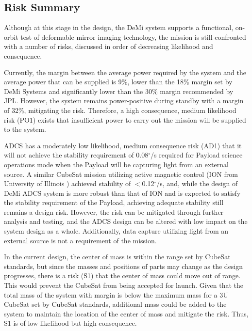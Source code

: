 \documentclass[12pt]{article}
\begin{document}
		\subsection{Risk Summary}

Although at this stage in the design, the DeMi system supports a functional, on-orbit test of deformable mirror imaging technology, the mission is still confronted with a number of risks, discussed in order of decreasing likelihood and consequence.  

Currently, the margin between the average power required by the system and the average power that can be supplied is 9\%, lower than the 18\% margin set by DeMi Systems and significantly lower than the 30\% margin recommended by JPL.  However, the system remains power-positive during standby with a margin of 32\%, mitigating the risk.  Therefore, a high consequence, medium likelihood risk (PO1) exists that insufficient power to carry out the mission will be supplied to the system. 

ADCS has a moderately low likelihood, medium consequence risk (AD1) that it will not achieve the stability requirement of 0.08$^\circ$/s required for Payload science operations mode when the Payload will be capturing light from an external source. A similar CubeSat mission utilizing active magnetic control (ION from University of Illinois \cite{ION-mission}) achieved stability of $<$0.12$^\circ$/s, and, while the design of DeMi ADCS system is more robust than that of ION and is expected to satisfy the stability requirement of the Payload, achieving adequate stability still remains a design risk. However, the risk can be mitigated through further analysis and testing, and the ADCS design can be altered with low impact on the system design as a whole.  Additionally, data capture utilizing light from an external source is not a requirement of the mission.

In the current design, the center of mass is within the range set by CubeSat standards, but since the masses and positions of parts may change as the design progresses, there is a risk (S1) that the center of mass could move out of range.  This would prevent the CubeSat from being accepted for launch.  Given that the total mass of the system with margin is below the maximum mass for a 3U CubeSat set by CubeSat standards, additional mass could be added to the system to maintain the location of the center of mass and mitigate the risk. Thus, S1 is of low likelihood but high consequence. 
\end{document}
